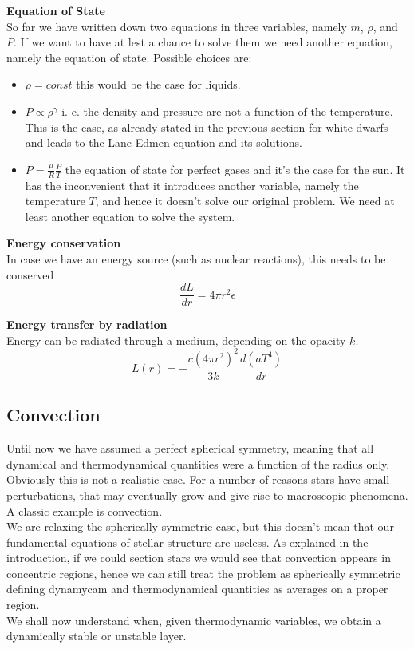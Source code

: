 \documentclass[11pt]{article}
\begin{document}
\textbf{Equation of State} \\
So far we have written down two equations in three variables, namely $m$, $\rho$, and $P$. If we want to have at lest a chance to solve them we need another equation, namely the equation of state. Possible choices are:
\begin{itemize}
	\item $\rho=const$ this would be the case for liquids.
	\item $P\propto \rho^\gamma$ i. e. the density and pressure are not a function of the temperature. This is the case, as already stated in the previous section for white dwarfs and leads to the Lane-Edmen equation and its solutions.
	\item $P=\frac{\mu}{R}\frac{P}{T}$ the equation of state for perfect gases and it's the case for the sun. It has the inconvenient that it introduces another variable, namely the temperature $T$, and hence it doesn't solve our original problem. We need at least another equation to solve the system. 
\end{itemize}

\textbf{Energy conservation} \\
In case we have an energy source (such as nuclear reactions), this needs to be conserved
\begin{equation}\label{energycons}
	\frac{dL}{dr} = 4 \pi r^2 \epsilon
\end{equation}

\textbf{Energy transfer by radiation} \\
Energy can be radiated through a medium, depending on the opacity $k$.
\begin{equation}\label{energytransfer}
	L(r)=-\frac{c(4 \pi r^2)^2}{3k} \frac{d(aT^4)}{dr}
\end{equation}


\subsection{Convection}
Until now we have assumed a perfect spherical symmetry, meaning that all dynamical and thermodynamical quantities were a function of the radius only. Obviously this is not a realistic case. For a number of reasons stars have small perturbations, that may eventually grow and give rise to macroscopic phenomena. A classic example is convection.\\
We are relaxing the spherically symmetric case, but this doesn't mean that our fundamental equations of stellar structure are useless. As explained in the introduction, if we could section stars we would see that convection appears in concentric regions, hence  we can still treat the problem as spherically symmetric defining dynamycam and thermodynamical quantities as averages on a proper region. \\
We shall now understand when, given thermodynamic variables, we obtain a dynamically stable or unstable layer.
\end{document}
